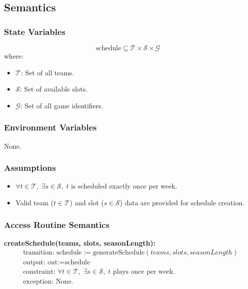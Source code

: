 \documentclass[12pt, titlepage]{article}
\begin{document}
\subsection{Semantics}

\subsubsection{State Variables}
\[
\text{schedule} \subseteq \mathcal{T} \times \mathcal{S} \times \mathcal{G}
\]
where:
\begin{itemize}
    \item \(\mathcal{T}\): Set of all teams.
    \item \(\mathcal{S}\): Set of available slots.
    \item \(\mathcal{G}\): Set of all game identifiers.
\end{itemize}

\subsubsection{Environment Variables}
None.

\subsubsection{Assumptions}
\begin{itemize}
    \item \( \forall t \in \mathcal{T}, \; \exists s \in \mathcal{S}, \; t\) is scheduled exactly once per week.
    \item Valid team (\(t \in \mathcal{T}\)) and slot (\(s \in \mathcal{S}\)) data are provided for schedule creation.
\end{itemize}

\subsubsection{Access Routine Semantics}

\noindent \textbf{createSchedule(teams, slots, seasonLength):}
\begin{align*}
    & \text{transition: } \text{schedule} := \text{generateSchedule}(teams, slots, seasonLength) \\
    & \text{output: } \text{out} := \text{schedule} \\
    & \text{constraint: } \forall t \in \mathcal{T}, \; \exists s \in \mathcal{S}, \; t \text{ plays once per week.} \\
    & \text{exception: } \text{None.}
\end{align*}
\end{document}
